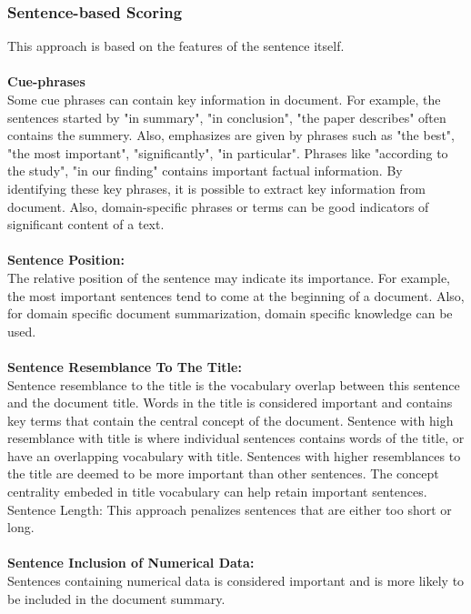 \documentclass[conference]{IEEEtran}
\begin{document}
\subsubsection{Sentence-based Scoring}
This approach is based on the features of the sentence itself.\\\\
\textbf{Cue-phrases}\\
Some cue phrases can contain key information in document. For example, the sentences started by "in summary", "in conclusion", "the paper describes" often contains the summery. Also, emphasizes are given by phrases such as "the best", "the most important", "significantly", "in particular". Phrases like "according to the study", "in our finding" contains important factual information. By identifying these key phrases, it is possible to extract key information from document. Also, domain-specific phrases or terms can be good indicators of significant content of a text.\\\\
\textbf{Sentence Position:}\\
The relative position of the sentence may indicate its importance. For example, the most important sentences tend to come at the beginning of a document. Also, for domain specific document summarization, domain specific knowledge can be used.\\\\
\textbf{Sentence Resemblance To The Title:}\\
Sentence resemblance to the title is the vocabulary overlap between this sentence and the document title. Words in the title is considered important and contains key terms that contain the central concept of the document. Sentence with high resemblance with title is where individual sentences contains words of the title, or have an overlapping vocabulary with title. Sentences with higher resemblances to the title are deemed to be more important than other sentences. The concept centrality embeded in title vocabulary can help retain important sentences.
Sentence Length: This approach penalizes sentences that are either too short or long.\\\\
\textbf{Sentence Inclusion of Numerical Data: }\\
Sentences containing numerical data is considered important and is more likely to be included in the document summary.\\
\end{document}
